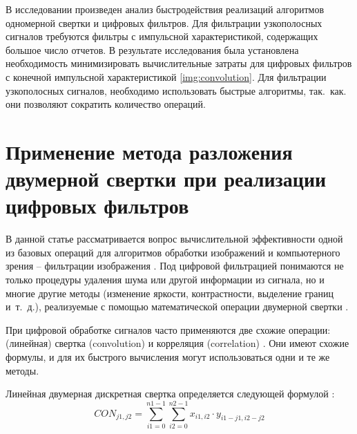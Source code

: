 В исследовании произведен анализ быстродействия реализаций алгоритмов одномерной свертки и цифровых фильтров. Для фильтрации  узкополосных сигналов требуются фильтры с импульсной характеристикой, содержащих большое число отчетов. 
В результате исследования была установлена необходимость минимизировать вычислительные затраты для цифровых фильтров с конечной импульсной характеристикой \ref{img:convolution}.
Для фильтрации  узкополосных сигналов, необходимо использовать быстрые алгоритмы, так.~как. они позволяют сократить количество операций. 


\section{Применение метода разложения двумерной свертки при реализации цифровых фильтров} \label{sec:ch3/sect5}
В данной статье рассматривается вопрос вычислительной эффективности одной из базовых операций для алгоритмов обработки изображений и компьютерного зрения – фильтрации изображения \cite{Gonzalez2012digital}.
Под цифровой фильтрацией понимаются не только процедуры удаления шума или другой информации из сигнала, но и многие другие методы (изменение яркости, контрастности, выделение границ и~т.~д.), реализуемые с помощью математической операции двумерной свертки \cite{Rabiner1978theory, bluehut1989fast}.


При цифровой обработке сигналов часто применяются две схожие операции: (линейная) свертка (convolution) и корреляция (correlation) \cite{bluehut1989fast, Lukin2002Introduction}. Они имеют схожие формулы, и для их быстрого вычисления могут использоваться одни и те же методы. 


Линейная двумерная дискретная свертка определяется следующей формулой \cite{decomposition_method_application2017}:
\begin{equation}
	\label{eq:equation3.5.1}
	CON_{j1,j2} = \sum_{i1 =0}^{n1-1} \sum_{i2 =0}^{n2-1} x_{i1,i2} \cdot y_{i1-j1,i2-j2}
\end{equation}

